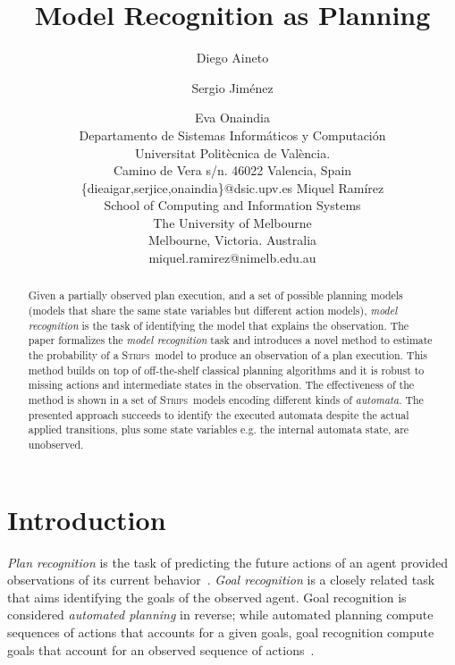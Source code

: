 \documentclass[letterpaper]{article} %
\newcommand{\strips}{\textsc{Strips}}     %
\begin{document}
\title{Model Recognition as Planning}

\author{Diego Aineto \and Sergio Jim\'enez\and Eva Onaindia\\
{\scriptsize Departamento de Sistemas Inform\'aticos y Computaci\'on}\\
{\scriptsize Universitat Polit\`ecnica de Val\`encia.}\\
{\scriptsize Camino de Vera s/n. 46022 Valencia, Spain}\\
{\scriptsize \{dieaigar,serjice,onaindia\}@dsic.upv.es}
\And Miquel Ram\'irez\\
{\scriptsize School of Computing and Information Systems}\\
{\scriptsize The University of Melbourne}\\
{\scriptsize Melbourne, Victoria. Australia}\\
{\scriptsize miquel.ramirez@nimelb.edu.au}}


\maketitle
\begin{abstract}
Given a partially observed plan execution, and a set of possible planning models (models that share the same state variables but different action models), {\em model recognition} is the task of identifying the model that explains the observation. The paper formalizes the {\em model recognition} task and introduces a novel method to estimate the probability of a \strips\ model to produce an observation of a plan execution. This method builds on top of off-the-shelf classical planning algorithms and it is robust to missing actions and intermediate states in the observation. The effectiveness of the method is shown in a set of \strips\ models encoding different kinds of {\em automata}. The presented approach succeeds to identify the executed automata despite the actual applied transitions, plus some state variables e.g. the internal automata state, are unobserved.
\end{abstract}

\section{Introduction}
\label{sec:introduction}
{\em Plan recognition} is the task of predicting the future actions of an agent provided observations of its current behavior~\cite{Carberry01}. {\em Goal recognition} is a closely related task that aims identifying the goals of the observed agent. Goal recognition is considered {\em automated planning} in reverse; while automated planning compute sequences of actions that accounts for a given goals, goal recognition compute goals that account for an observed sequence of actions~\cite{geffner:book:2013}.
\end{document}
